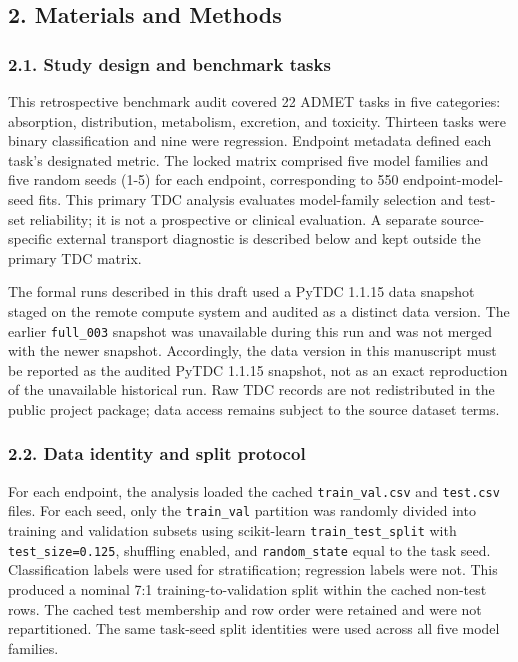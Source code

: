 \documentclass[
]{article}
\begin{document}
\subsection{2. Materials and Methods}\label{materials-and-methods}

\subsubsection{2.1. Study design and benchmark
tasks}\label{study-design-and-benchmark-tasks}

This retrospective benchmark audit covered 22 ADMET tasks in five
categories: absorption, distribution, metabolism, excretion, and
toxicity. Thirteen tasks were binary classification and nine were
regression. Endpoint metadata defined each task's designated metric. The
locked matrix comprised five model families and five random seeds (1-5)
for each endpoint, corresponding to 550 endpoint-model-seed fits. This primary TDC analysis evaluates model-family selection and
test-set reliability; it is not a prospective or clinical evaluation. A
separate source-specific external transport diagnostic is described
below and kept outside the primary TDC matrix.

The formal runs described in this draft used a PyTDC 1.1.15 data
snapshot staged on the remote compute system and audited as a distinct
data version. The earlier \texttt{full\_003} snapshot was unavailable
during this run and was not merged with the newer snapshot. Accordingly,
the data version in this manuscript must be reported as the audited
PyTDC 1.1.15 snapshot, not as an exact reproduction of the unavailable
historical run. Raw TDC records are not redistributed in the
public project package; data access remains subject to the source
dataset terms.

\subsubsection{2.2. Data identity and split
protocol}\label{data-identity-and-split-protocol}

For each endpoint, the analysis loaded the cached
\texttt{train\_val.csv} and \texttt{test.csv} files. For each seed, only
the \texttt{train\_val} partition was randomly divided into training and
validation subsets using scikit-learn \texttt{train\_test\_split} with
\texttt{test\_size=0.125}, shuffling enabled, and \texttt{random\_state}
equal to the task seed. Classification labels were used for
stratification; regression labels were not. This produced a nominal 7:1
training-to-validation split within the cached non-test rows. The cached
test membership and row order were retained and were not repartitioned.
The same task-seed split identities were used across all five model
families.
\end{document}
